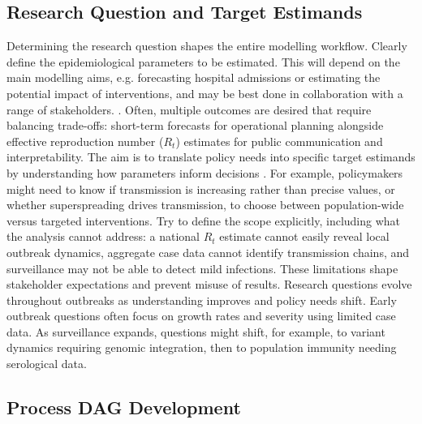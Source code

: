 \documentclass{article}
\begin{document}
\subsection{Research Question and Target Estimands}

Determining the research question shapes the entire modelling workflow.
Clearly define the epidemiological parameters to be estimated. This will depend on the main modelling aims, e.g. forecasting hospital admissions or estimating the potential impact of interventions, and may be best done in collaboration with a range of stakeholders. \citep{marshall2024when}.
Often, multiple outcomes are desired that require balancing trade-offs: short-term forecasts for operational planning alongside effective reproduction number ($R_t$) estimates for public communication and interpretability.
The aim is to translate policy needs into specific target estimands by understanding how parameters inform decisions \citep{nicholson2022interoperability, gip-2024-ru}.
For example, policymakers might need to know if transmission is increasing rather than precise values, or whether superspreading drives transmission, to choose between population-wide versus targeted interventions.
Try to define the scope explicitly, including what the analysis cannot address: a national $R_t$ estimate cannot easily reveal local outbreak dynamics, aggregate case data cannot identify transmission chains, and surveillance may not be able to detect mild infections.
These limitations shape stakeholder expectations and prevent misuse of results.
Research questions evolve throughout outbreaks as understanding improves and policy needs shift.
Early outbreak questions often focus on growth rates and severity using limited case data.
As surveillance expands, questions might shift, for example, to variant dynamics requiring genomic integration, then to population immunity needing serological data.

\subsection{Process DAG Development} \label{sec:process}
\end{document}

